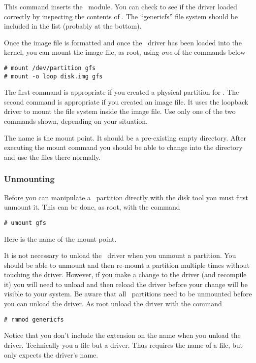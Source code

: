 This command inserts the \GenericFS\ module. You can check to see if the driver loaded correctly
by inspecting the contents of . The ``genericfs'' file system should
be included in the list (probably at the bottom).

Once the image file is formatted and once the \GenericFS\ driver has been loaded into the
kernel, you can mount the image file, as root, using \emph{one} of the commands below
\begin{verbatim}
# mount /dev/partition gfs
# mount -o loop disk.img gfs
\end{verbatim}

The first command is appropriate if you created a physical partition for \GenericFS. The second
command is appropriate if you created an image file. It uses the loopback driver to mount the
file system inside the image file. Use only one of the two commands shown, depending on your
situation.

The name  is the mount point. It should be a pre-existing empty directory. After
executing the mount command you should be able to change into the  directory and
use the files there normally.

\subsubsection{Unmounting}

Before you can manipulate a \GenericFS\ partition directly with the disk tool you must first
unmount it. This can be done, as root, with the command
\begin{verbatim}
# umount gfs
\end{verbatim}

Here  is the name of the mount point.

It is not necessary to unload the \GenericFS\ driver when you unmount a partition. You should be
able to unmount and then re-mount a partition multiple times without touching the driver.
However, if you make a change to the driver (and recompile it) you will need to unload and then
reload the driver before your change will be visible to your system. Be aware that all
\GenericFS\ partitions need to be unmounted before you can unload the driver. As root unload the
driver with the command
\begin{verbatim}
# rmmod genericfs
\end{verbatim}

Notice that you don't include the  extension on the name when you unload the
driver. Technically you  a file but  a driver. Thus
 requires the name of a file, but  only expects the driver's
name.

